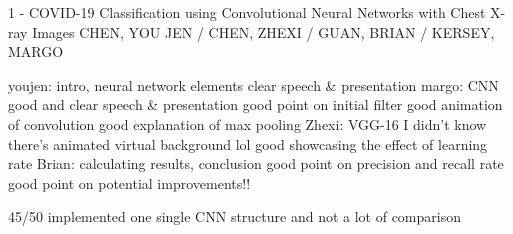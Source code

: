 1 - COVID-19 Classification using Convolutional Neural Networks with Chest X-ray Images
CHEN, YOU JEN / CHEN, ZHEXI / GUAN, BRIAN / KERSEY, MARGO

youjen: intro, neural network elements
clear speech & presentation
margo: CNN
good and clear speech & presentation
good point on initial filter
good animation of convolution
good explanation of max pooling
Zhexi: VGG-16
I didn't know there's animated virtual background lol
good showcasing the effect of learning rate
Brian: calculating results, conclusion
good point on precision and recall rate
good point on potential improvements!!

45/50 implemented one single CNN structure and not a lot of comparison
